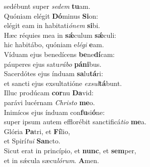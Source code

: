 \oddverse sedébunt super \textit{se}\textit{dem} \textbf{tu}am.\\
\evenverse Quóniam elégit \textbf{Dó}minus \textbf{Si}on:~\*\\
\evenverse elégit eam in habitati\textit{ó}\textit{nem} \textbf{si}bi.\\
\oddverse Hæc réquies mea in \textbf{sǽ}culum \textbf{sǽ}culi:~\*\\
\oddverse hic habitábo, quóniam e\textit{lé}\textit{gi} \textbf{e}am.\\
\evenverse Víduam ejus benedícens \textbf{be}ne\textbf{dí}cam:~\*\\
\evenverse páuperes ejus satu\textit{rá}\textit{bo} \textbf{pá}\textbf{ni}bus.\\
\oddverse Sacerdótes ejus índuam \textbf{sa}lu\textbf{tá}ri:~\*\\
\oddverse et sancti ejus exsultatióne \textit{ex}\textit{sul}\textbf{tá}bunt.\\
\evenverse Illuc prodúcam \textbf{cor}nu \textbf{Da}vid:~\*\\
\evenverse parávi lucérnam \textit{Chri}\textit{sto} \textbf{me}o.\\
\oddverse Inimícos ejus índuam con\textbf{fu}si\textbf{ó}ne:~\*\\
\oddverse super ipsum autem efflorébit sanctificá\textit{ti}\textit{o} \textbf{me}a.\\
\evenverse Glória \textbf{Pa}tri, et \textbf{Fí}lio,~\*\\
\evenverse et Spirí\textit{tu}\textit{i} \textbf{San}cto.\\
\oddverse Sicut erat in princípio, et \textbf{nunc}, et \textbf{sem}per,~\*\\
\oddverse et in sǽcula sæcu\textit{ló}\textit{rum}. \textbf{A}men.\\
